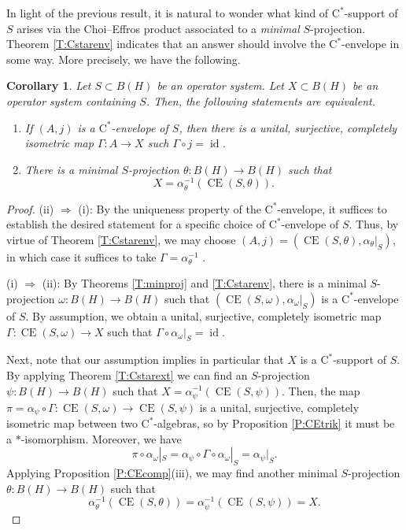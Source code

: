 \documentclass[10pt]{amsart}
\newcommand{\rC}{\mathrm{C}}
\newcommand{\CE}{\operatorname{CE}}
\newcommand{\id}{\operatorname{id}}
\newtheorem{corollary}[lemma]{Corollary}
\theoremstyle{definition}
\begin{document}
In light of the previous result, it is natural to wonder what kind of $\rC^*$-support of $S$ arises via the Choi--Effros product associated to a \emph{minimal} $S$-projection. Theorem \ref{T:Cstarenv} indicates that an answer should involve the $\rC^*$-envelope in some way. More precisely, we have the following.



\begin{corollary}\label{C:coversenv}
Let $S\subset B(H)$  be an operator system. Let $X\subset B(H)$ be an operator system containing $S$.  Then, the following statements are equivalent.
\begin{enumerate}[{\rm (i)}]
\item If $(A,j)$ is a $\rC^*$-envelope of $S$, then there is a unital, surjective, completely isometric map  $\Gamma:A\to X$ such $\Gamma\circ j=\id$. 
\item There is a minimal $S$-projection $\theta:B(H)\to B(H)$ such that  \[X=\alpha_\theta ^{-1}(\CE(S,\theta)).\]
\end{enumerate}
\end{corollary} 
\begin{proof}
(ii) $\Rightarrow$ (i): By the uniqueness property of the $\rC^*$-envelope, it suffices to establish the desired statement for a specific choice of $\rC^*$-envelope of $S$. Thus, by virtue of Theorem \ref{T:Cstarenv}, we may choose $(A,j)=(\CE(S,\theta),\alpha_\theta|_S)$, in which case it suffices to take $\Gamma=\alpha_\theta^{-1}$ .

(i) $\Rightarrow$ (ii): By Theorems \ref{T:minproj} and \ref{T:Cstarenv}, there is a minimal $S$-projection $\omega:B(H)\to B(H)$ such that $(\CE(S,\omega),\alpha_{\omega}|_S)$ is a $\rC^*$-envelope of $S$. By assumption, we obtain a unital, surjective, completely isometric map $\Gamma:\CE(S,\omega)\to X$ such that $\Gamma\circ \alpha_{\omega}|_S=\id$.

Next, note that our assumption implies in particular that  $X$ is a $\rC^*$-support of $S$. By applying Theorem \ref{T:Cstarext} we can find an $S$-projection $\psi:B(H)\to B(H)$ such that $X=\alpha_\psi^{-1}(\CE(S,\psi))$.  Then, the map $\pi=\alpha_\psi\circ\Gamma:\CE(S,\omega)\to \CE(S,\psi)$ is a unital, surjective, completely isometric map between two $\rC^*$-algebras, so by Proposition \ref{P:CEtrik} it must be a $*$-isomorphism.
Moreover, we have
\[
\pi\circ \alpha_\omega|_S=\alpha_\psi\circ \Gamma\circ \alpha_\omega|_S=\alpha_{\psi}|_S.
\]
Applying Proposition \ref{P:CEcomp}(iii), we may find another minimal $S$-projection $\theta:B(H)\to B(H)$ such that 
\[
\alpha_{\theta}^{-1}(\CE(S,\theta))=\alpha_\psi^{-1}(\CE(S,\psi))=X.
\]
\end{proof}
\end{document}
